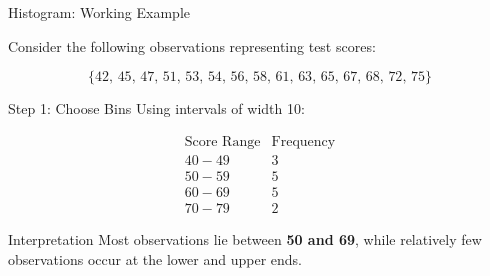 \documentclass{beamer}
\begin{document}
\begin{frame}{Histogram: Working Example}

Consider the following observations representing test scores:

\[
\{42,\,45,\,47,\,51,\,53,\,54,\,56,\,58,\,
61,\,63,\,65,\,67,\,68,\,72,\,75\}
\]

\vspace{0.1cm}

\begin{block}{Step 1: Choose Bins}
Using intervals of width 10:

\[
\begin{array}{c|c}
\text{Score Range} & \text{Frequency} \\ \hline
40-49 & 3 \\
50-59 & 5 \\
60-69 & 5 \\
70-79 & 2
\end{array}
\]
\end{block}

\vspace{0.1cm}

\begin{block}{Interpretation}
Most observations lie between \textbf{50 and 69}, while relatively
few observations occur at the lower and upper ends.
\end{block}

\end{frame}

\end{document}
